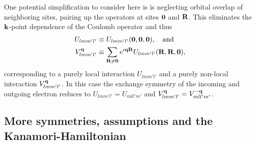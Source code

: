 \documentclass[\main/main.tex]{subfiles}
\begin{document}
One potential simplification to consider here is is neglecting orbital overlap of neighboring sites, pairing up the operators at sites $\textbf{0}$ and $\textbf{R}$. This eliminates the $\textbf{k}$-point dependence of the Coulomb operator and thus
\begin{subequations}
\begin{align}
	U_{lmm'l'}&\equiv U_{lmm'l'}(\textbf{0},\textbf{0},\textbf{0}),\quad\text{and}\\
	V^{\textbf{q}}_{lmm'l'}&\equiv\sum_{\textbf{R}\neq\textbf{0}}e^{i\textbf{qR}}U_{lmm'l'}(\textbf{R},\textbf{R},\textbf{0}),
\end{align}
\end{subequations}
corresponding to a purely local interaction $U_{lmm'l'}$ and a purely non-local interaction $V^{\textbf{q}}_{lmm'l'}$. In this case the exchange symmetry of the incoming and outgoing electron reduces to $U_{lmm'l'}=U_{mll'm'}$ and $V^{\textbf{q}}_{lmm'l'}=V^{-\textbf{q}}_{mll'm'}$.


\subsection{More symmetries, assumptions and the Kanamori-Hamiltonian}
\end{document}
